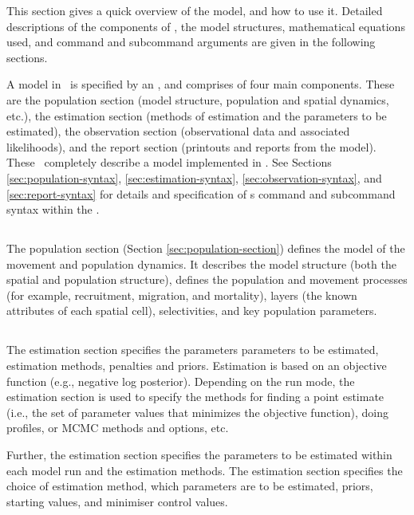 This section gives a quick overview of the model, and how to use it. Detailed descriptions of the components of \SPM, the model structures, mathematical equations used, and command and subcommand arguments are given in the following sections.

A model in \SPM\ is specified by an \config, and comprises of four main components. These are the population section (model structure, population and spatial dynamics, etc.), the estimation section (methods of estimation and the parameters to be estimated), the observation section (observational data and associated likelihoods), and the report section (printouts and reports from the model). These \config\ completely describe a model implemented in \SPM. See Sections \ref{sec:population-syntax}, \ref{sec:estimation-syntax}, \ref{sec:observation-syntax}, and \ref{sec:report-syntax} for details and specification of \SPM s command and subcommand syntax within the \config. 

\subsection{}

The population section (Section \ref{sec:population-section}) defines the model of the movement and population dynamics. It describes the model structure (both the spatial and population structure), defines the population and movement processes (for example, recruitment, migration, and mortality), layers (the known attributes of each spatial cell), selectivities, and key population parameters.

\subsection{}

The estimation section specifies the parameters parameters to be estimated, estimation methods, penalties and priors. Estimation is based on an objective function (e.g., negative log posterior). Depending on the run mode, the estimation section is used to specify the methods for finding a point estimate (i.e., the set of parameter values that minimizes the objective function), doing profiles, or MCMC methods and options, etc.

Further, the estimation section specifies the parameters to be estimated within each model run and the estimation methods. The estimation section specifies the choice of estimation method, which parameters are to be estimated, priors, starting values, and minimiser control values.


